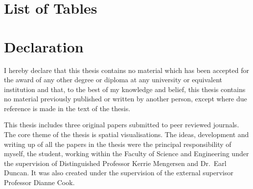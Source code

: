 \documentclass{monashthesis}
\begin{document}
\hypertarget{list-of-tables}{%
\chapter*{List of Tables}\label{list-of-tables}}

\begin{Shaded}
\begin{Highlighting}[]
\StringTok{ }\OperatorTok{::}\NormalTok{(}
   \NormalTok{(}\NormalTok{(}\NormalTok{, }\NormalTok{)),}
   \NormalTok{(}\NormalTok{(}\OperatorTok{:}\NormalTok{)),}
   \NormalTok{(}
    \NormalTok{,}
    \NormalTok{,}
    \NormalTok{,}
    \NormalTok{,}
    \NormalTok{,}
    \NormalTok{)}
\NormalTok{)}
\end{Highlighting}
\end{Shaded}

\hypertarget{declaration}{%
\chapter*{Declaration}\label{declaration}}

I hereby declare that this thesis contains no material which has been accepted for the award of any other degree or diploma at any university or equivalent institution and that, to the best of my knowledge and belief, this thesis contains no material previously published or written by another person, except where due reference is made in the text of the thesis.

This thesis includes three original papers submitted to peer reviewed journals. The core theme of the thesis is spatial visualisations. The ideas, development and writing up of all the papers in the thesis were the principal responsibility of myself, the student, working within the Faculty of Science and Engineering under the supervision of Distinguished Professor Kerrie Mengersen and Dr.~Earl Duncan. It was also created under the supervision of the external supervisor Professor Dianne Cook.
\end{document}
